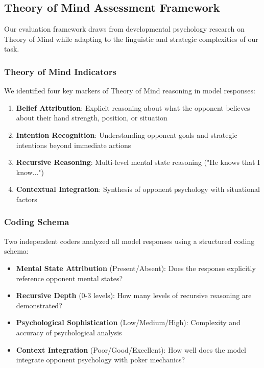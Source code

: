 \subsection{Theory of Mind Assessment Framework}
\label{subsec:tom_framework}

Our evaluation framework draws from developmental psychology research on Theory of Mind while adapting to the linguistic and strategic complexities of our task.

\subsubsection{Theory of Mind Indicators}

We identified four key markers of Theory of Mind reasoning in model responses:

\begin{enumerate}
    \item \textbf{Belief Attribution}: Explicit reasoning about what the opponent believes about their hand strength, position, or situation
    
    \item \textbf{Intention Recognition}: Understanding opponent goals and strategic intentions beyond immediate actions
    
    \item \textbf{Recursive Reasoning}: Multi-level mental state reasoning ("He knows that I know...")
    
    \item \textbf{Contextual Integration}: Synthesis of opponent psychology with situational factors
\end{enumerate}

\subsubsection{Coding Schema}

Two independent coders analyzed all model responses using a structured coding schema:

\begin{itemize}
    \item \textbf{Mental State Attribution} (Present/Absent): Does the response explicitly reference opponent mental states?
    
    \item \textbf{Recursive Depth} (0-3 levels): How many levels of recursive reasoning are demonstrated?
    
    \item \textbf{Psychological Sophistication} (Low/Medium/High): Complexity and accuracy of psychological analysis
    
    \item \textbf{Context Integration} (Poor/Good/Excellent): How well does the model integrate opponent psychology with poker mechanics?
\end{itemize}

